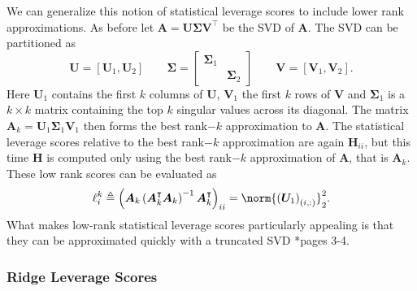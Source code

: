 We can generalize this notion of statistical leverage scores to include lower rank approximations. As before let $\bm{A} = \bm{U} \bm{\Sigma} \bm{V}^{\intercal}$ be the SVD of $\bm{A}$. The SVD can be partitioned as
\begin{equation*}
    \bm{U} = \left[ \bm{U}_1 , \bm{U}_2 \right] \qquad \bm{\Sigma} =
    \begin{bmatrix}
        \bm{\Sigma}_1 &               \\
                      & \bm{\Sigma}_2
    \end{bmatrix}
    \qquad
    \bm{V} = \left[ \bm{V}_1 , \bm{V}_2 \right].
\end{equation*}
Here $\bm{U}_1$ contains the first $k$ columns of $\bm{U}$, $\bm{V}_1$ the first $k$ rows of $\bm{V}$ and $\bm{\Sigma}_1$ is a $k \times k$ matrix containing the top $k$ singular values across its diagonal. The matrix $\bm{A}_k = \bm{U}_1 \bm{\Sigma}_1 \bm{V}_1$ then forms the best rank$-k$ approximation to $\bm{A}$. The statistical leverage scores relative to the best rank$-k$ approximation are again $\bm{H}_{ii}$, but this time $\bm{H}$ is computed only using the best rank$-k$ approximation of $\bm{A}$, that is $\bm{A}_k$. These low rank scores can be evaluated as
\begin{equation*} \label{eq: lev-scrs-1}
    \ell_i^k \triangleq \left( \bm{A}_{k} \left( \bm{A}_{k}^{\intercal} \bm{A}_{k} \right)^{-1} \bm{A}_{k}^{\intercal} \right)_{ii} = \norm{\left( \bm{U}_1 \right)_{(i,:)}}_2^2.
\end{equation*}
What makes low-rank statistical leverage scores particularly appealing is that they can be approximated quickly with a truncated SVD \cite{DBLP:journals/corr/abs-1303-1849}*{pages 3-4}.

\subsubsection{Ridge Leverage Scores}

